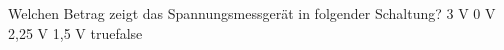     {Welchen Betrag zeigt das Spannungsmessgerät in folgender Schaltung? }
    {3 V}
    {0 V}
    {2,25 V}
    {1,5 V}
    {true}{false}